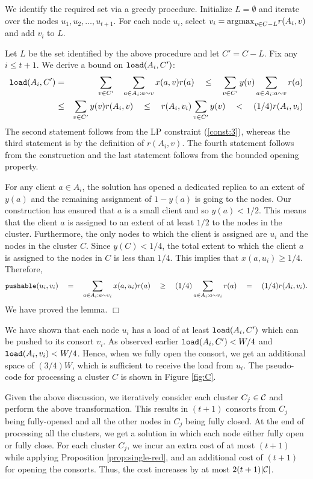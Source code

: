 \documentclass[11pt]{article}
\newcommand{\calC} {{\cal C}}
\newcommand{\load} {{\tt load}}
\newcommand{\push} {{\tt pushable}}
\newcommand{\argmax} {{\rm argmax}}
\newcommand{\qed} {\hfill$\Box$}
\begin{document}
We identify the required set via a greedy procedure. 
Initialize $L=\emptyset$ and iterate over the nodes $u_1, u_2, \ldots, u_{t+1}$.
For each node $u_i$, select $v_i=\argmax_{v\in C-L} r(A_i, v)$
and add $v_i$ to $L$. 

Let $L$ be the set identified by the above procedure and let $C' = C-L$.
Fix any $i\leq t+1$.  We derive a bound on $\load(A_i, C')$:
\begin{eqnarray*}
	\load(A_i, C') 
	&=& \sum_{v\in C'} \quad \sum_{a\in A_i:a\sim v} x(a, v) r(a) \quad \leq \quad \sum_{v\in C'} y(v) \sum_{a\in A_i:a\sim v} r(a)\\
	&\leq& \sum_{v\in C'} y(v) r(A_i, v) \quad \leq \quad r(A_i, v_i)\sum_{v\in C'} y(v)\quad < \quad (1/4)r(A_i, v_i)
\end{eqnarray*}
The second statement follows from the LP constraint (\ref{const:3}),
whereas the third statement is by the definition of $r(A_i, v)$.
The fourth statement follows from the construction
and the last statement follows from the bounded opening property.

For any client $a\in A_i$, the solution has opened a dedicated replica to an extent of $y(a)$
and the remaining assignment of $1-y(a)$ is going to the nodes.
Our construction has ensured that $a$ is a small client and so $y(a) < 1/2$.
This means that the client $a$ is assigned to an extent of at least $1/2$ to the nodes in the cluster.
Furthermore, the only nodes to which the client is assigned are $u_i$ and the nodes in the cluster $C$. 
Since $y(C) < 1/4$, the total extent to which the client $a$ is assigned to the nodes in $C$
is less than $1/4$. This implies that $x(a, u_i) \geq 1/4$. 
Therefore, 
\[
\push(u_i, v_i) \quad = \quad \sum_{a\in A_i:a\sim v_i} x(a, u_i)r(a) \quad \geq \quad (1/4)\sum_{a\in A_i:a \sim v_i} r(a) \quad = \quad (1/4)r(A_i, v_i).
\]
We have proved the lemma.
\qed

We have shown that each node $u_i$ has a load of at least $\load(A_i, C')$ which can be pushed to its consort $v_i$.
As observed earlier $\load(A_i, C') < W/4$ and $\load(A_i, v_i) < W/4$.
Hence, when we fully open the consort, we get an additional space of $(3/4)W$, which is sufficient to receive the load from $u_i$.
The pseudo-code for processing a cluster $C$ is shown in Figure \ref{fig:C}.


Given the above discussion, we iteratively consider each cluster $C_j\in \calC$ and perform the above transformation.
This results in $(t+1)$ consorts from $C_j$ being fully-opened and all the other nodes in $C_j$
being fully closed. At the end of processing all the clusters, we get a solution in which each node
either fully open or fully close. 
For each cluster $C_j$, we incur an extra cost of at most $(t+1)$ while applying Proposition \ref{prop:single-red}, 
and an additional cost of $(t+1)$ for opening the consorts.
Thus, the cost increases by at most $2(t+1)|\calC|$.
\end{document}
